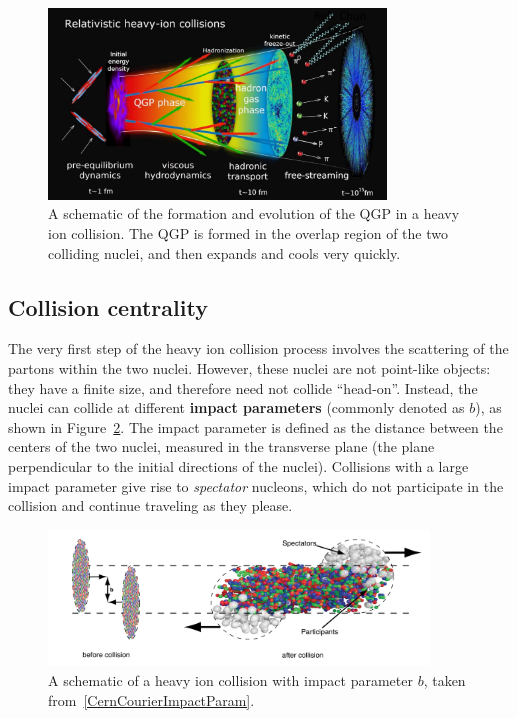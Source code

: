 \begin{figure}[ht!]
    \centering
    \includegraphics[width=0.8\textwidth]{figures/introduction/heavy_ion_phases.png}
    \caption{A schematic of the formation and evolution of the QGP in a heavy ion collision. The QGP is formed in the overlap region of the two colliding nuclei, and then expands and cools very quickly.}
    \label{fig:qgp_evolution}
\end{figure}

\subsection{Collision centrality}
\label{sec:collision_centrality}

The very first step of the heavy ion collision process involves the scattering of the partons within the two nuclei. However, these nuclei are not point-like objects: they have a finite size, and therefore need not collide ``head-on''. Instead, the nuclei can collide at different \textbf{impact parameters} (commonly denoted as $b$), as shown in Figure~\ref{fig:impact_parameter}. The impact parameter is defined as the distance between the centers of the two nuclei, measured in the transverse plane (the plane perpendicular to the initial directions of the nuclei). Collisions with a large impact parameter give rise to \textit{spectator} nucleons, which do not participate in the collision and continue traveling as they please.

\begin{figure}[ht]
    \centering
    \includegraphics[width=0.9\textwidth]{figures/introduction/impact_parameter.png}
    \caption{A schematic of a heavy ion collision with impact parameter $b$, taken from~\ref{CernCourierImpactParam}.}
    \label{fig:impact_parameter}
\end{figure}

